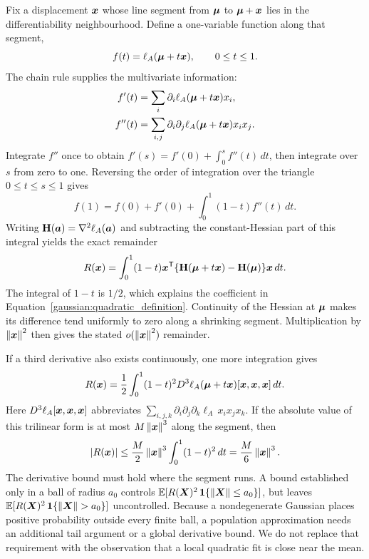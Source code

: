 Fix a displacement $\boldsymbol{x}$ whose line segment from $\boldsymbol{\mu}$ to
$\boldsymbol{\mu}+\boldsymbol{x}$ lies in the differentiability neighbourhood. Define a
one-variable function along that segment,
\[
f(t)=\ell_A(\boldsymbol{\mu}+t\boldsymbol{x}),\qquad 0\leq t\leq1.
\]
The chain rule supplies the multivariate information:
\begin{align}
f'(t)&=\sum_i\partial_i\ell_A(\boldsymbol{\mu}+t\boldsymbol{x})x_i,
\nonumber\\
f''(t)&=\sum_{i,j}\partial_i\partial_j
               \ell_A(\boldsymbol{\mu}+t\boldsymbol{x})x_i x_j.
\end{align}
Integrate $f''$ once to obtain $f'(s)=f'(0)+\int_0^s f''(t)\,dt$,
then integrate over $s$ from zero to one. Reversing the order of integration
over the triangle $0\leq t\leq s\leq1$ gives
\[
f(1)=f(0)+f'(0)+\int_0^1(1-t)f''(t)\,dt.
\]
Writing $\mathbf{H}(\boldsymbol{a})=\nabla^2\ell_A(\boldsymbol{a})$ and subtracting the
constant-Hessian part of this integral yields the exact remainder
\begin{equation}
R(\boldsymbol{x})
 =\int_0^1(1-t)\boldsymbol{x}^{\mathsf T}
       \{\mathbf{H}(\boldsymbol{\mu}+t\boldsymbol{x})-\mathbf{H}(\boldsymbol{\mu})\}
       \boldsymbol{x}\,dt.
\label{gaussian:second_order_remainder}
\end{equation}
The integral of $1-t$ is $1/2$, which explains the coefficient in
Equation~\eqref{gaussian:quadratic_definition}. Continuity of the Hessian
at $\boldsymbol{\mu}$ makes its difference tend uniformly to zero along a
shrinking segment. Multiplication by $\left\lVert \boldsymbol{x}\right\rVert^2$ then gives the
stated $o(\left\lVert \boldsymbol{x}\right\rVert^2)$ remainder.

If a third derivative also exists continuously, one more integration gives
\begin{equation}
R(\boldsymbol{x})
 =\frac12\int_0^1(1-t)^2
  D^3\ell_A(\boldsymbol{\mu}+t\boldsymbol{x})
     [\boldsymbol{x},\boldsymbol{x},\boldsymbol{x}]\,dt.
\label{gaussian:integral_remainder}
\end{equation}
Here $D^3\ell_A[\boldsymbol{x},\boldsymbol{x},\boldsymbol{x}]$ abbreviates
$\sum_{i,j,k}\partial_i\partial_j\partial_k\ell_A\,x_i x_j x_k$.
If the absolute value of this trilinear form is at most
$M\left\lVert \boldsymbol{x}\right\rVert^3$ along the segment, then
\begin{equation}
|R(\boldsymbol{x})|\leq\frac M2\left\lVert \boldsymbol{x}\right\rVert^3
                    \int_0^1(1-t)^2\,dt
                 =\frac M6\left\lVert \boldsymbol{x}\right\rVert^3.
\label{gaussian:remainder_bound}
\end{equation}
The derivative bound must hold where the segment runs. A bound established
only in a ball of radius $a_0$ controls
$\mathbb E[R(\boldsymbol{X})^2\,\mathbf1\{\left\lVert \boldsymbol{X}\right\rVert\leq a_0\}]$, but leaves
$\mathbb E[R(\boldsymbol{X})^2\,\mathbf1\{\left\lVert \boldsymbol{X}\right\rVert>a_0\}]$ uncontrolled.
Because a nondegenerate Gaussian places positive probability outside every
finite ball, a population approximation needs an additional tail argument
or a global derivative bound. We do not replace that requirement with the
observation that a local quadratic fit is close near the mean.

